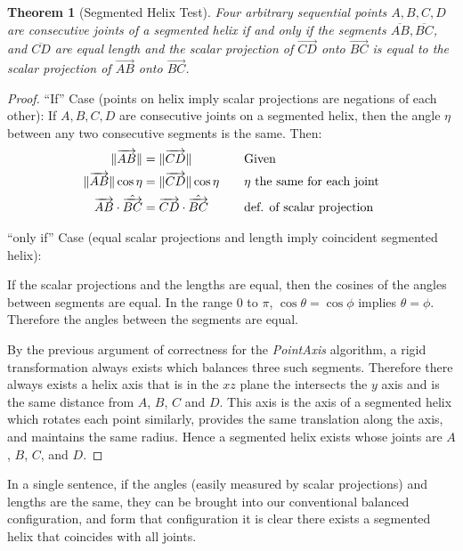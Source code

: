 \documentclass[11pt]{article}
\DeclarePairedDelimiter{\norm}{\lVert}{\rVert}
\newtheorem{theorem}{Theorem}
\begin{document}
{\begin{theorem}[Segmented Helix Test]
  Four arbitrary sequential points $A,B,C,D$ are consecutive joints of a segmented helix if and only if
  the segments $\overline{AB},\overline{BC}$, and $\overline{CD}$ are equal length and the scalar projection
  of $\overrightarrow{CD}$ onto $\overrightarrow{BC}$ is equal to the scalar projection of $\overrightarrow{AB}$
  onto $\overrightarrow{BC}$.
\end{theorem}

\begin{proof}
  ``If'' Case (points on helix imply scalar projections are negations of each other):
  If $A,B,C,D$ are consecutive joints on a segmented helix, then the angle $\eta$ between any two consecutive segments is the
  same. Then:
  \begin{alignat*}{2}
    \norm{\overrightarrow{AB}} &= \norm{\overrightarrow{CD}} &\quad &\text{Given}\\
    \norm{\overrightarrow{AB}}\cos{\eta} &= \norm{\overrightarrow{CD}}\cos{\eta} &\quad &\text{$\eta$ the same for each joint} \\
    \overrightarrow{AB} \cdot \hat{\overrightarrow{BC}} &= \overrightarrow{CD} \cdot \hat{\overrightarrow{BC}} &\quad &\text{def. of scalar projection} \\
  \end{alignat*}

  ``only if'' Case (equal scalar projections and length imply coincident segmented helix):

  If the scalar projections and the lengths are equal, then the cosines of the angles between segments are equal.
  In the range $0$ to $\pi$,
  $\cos{\theta} = \cos{\phi}$ implies $\theta = \phi$. Therefore the angles between the segments are equal.

  By the previous argument of correctness for the {\em PointAxis} algorithm, a rigid transformation always exists
  which balances three such segments. Therefore there always exists a helix axis that
  is in the $xz$ plane the intersects the $y$ axis and is the same distance from $A$, $B$, $C$ and $D$.
  This axis is the axis of a segmented helix which rotates each point similarly, provides the same translation along the axis,
  and maintains the same radius. Hence a segmented helix exists whose joints are $A$, $B$, $C$, and $D$.
\end{proof}

In a single sentence, if the angles (easily measured by scalar projections) and lengths are the same,
they can be brought into our conventional balanced configuration,
and form that configuration it is clear there exists a segmented helix that coincides with all joints.

}
\end{document}
